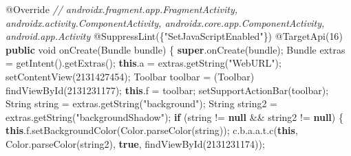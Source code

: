 \documentclass[
]{article}
\newenvironment{Shaded}{}{}
\newcommand{\AttributeTok}[1]{\textcolor[rgb]{0.49,0.56,0.16}{#1}}
\newcommand{\BuiltInTok}[1]{\textcolor[rgb]{0.00,0.50,0.00}{#1}}
\newcommand{\CommentTok}[1]{\textcolor[rgb]{0.38,0.63,0.69}{\textit{#1}}}
\newcommand{\ControlFlowTok}[1]{\textcolor[rgb]{0.00,0.44,0.13}{\textbf{#1}}}
\newcommand{\DataTypeTok}[1]{\textcolor[rgb]{0.56,0.13,0.00}{#1}}
\newcommand{\DecValTok}[1]{\textcolor[rgb]{0.25,0.63,0.44}{#1}}
\newcommand{\FunctionTok}[1]{\textcolor[rgb]{0.02,0.16,0.49}{#1}}
\newcommand{\KeywordTok}[1]{\textcolor[rgb]{0.00,0.44,0.13}{\textbf{#1}}}
\newcommand{\NormalTok}[1]{#1}
\newcommand{\OperatorTok}[1]{\textcolor[rgb]{0.40,0.40,0.40}{#1}}
\newcommand{\StringTok}[1]{\textcolor[rgb]{0.25,0.44,0.63}{#1}}
\begin{document}
\begin{Shaded}
\begin{Highlighting}[]
    \AttributeTok{@Override} \CommentTok{// androidx.fragment.app.FragmentActivity, androidx.activity.ComponentActivity, androidx.core.app.ComponentActivity, android.app.Activity}
    \AttributeTok{@SuppressLint}\OperatorTok{(\{}\StringTok{"SetJavaScriptEnabled"}\OperatorTok{\})}
    \AttributeTok{@TargetApi}\OperatorTok{(}\DecValTok{16}\OperatorTok{)}
    \KeywordTok{public} \DataTypeTok{void} \FunctionTok{onCreate}\OperatorTok{(}\NormalTok{Bundle bundle}\OperatorTok{)} \OperatorTok{\{}
        \KeywordTok{super}\OperatorTok{.}\FunctionTok{onCreate}\OperatorTok{(}\NormalTok{bundle}\OperatorTok{);}
\NormalTok{        Bundle extras }\OperatorTok{=} \FunctionTok{getIntent}\OperatorTok{().}\FunctionTok{getExtras}\OperatorTok{();}
        \KeywordTok{this}\OperatorTok{.}\FunctionTok{a} \OperatorTok{=}\NormalTok{ extras}\OperatorTok{.}\FunctionTok{getString}\OperatorTok{(}\StringTok{"WebURL"}\OperatorTok{);}
        \FunctionTok{setContentView}\OperatorTok{(}\DecValTok{2131427454}\OperatorTok{);}
\NormalTok{        Toolbar toolbar }\OperatorTok{=} \OperatorTok{(}\NormalTok{Toolbar}\OperatorTok{)} \FunctionTok{findViewById}\OperatorTok{(}\DecValTok{2131231177}\OperatorTok{);}
        \KeywordTok{this}\OperatorTok{.}\FunctionTok{f} \OperatorTok{=}\NormalTok{ toolbar}\OperatorTok{;}
        \FunctionTok{setSupportActionBar}\OperatorTok{(}\NormalTok{toolbar}\OperatorTok{);}
        \BuiltInTok{String}\NormalTok{ string }\OperatorTok{=}\NormalTok{ extras}\OperatorTok{.}\FunctionTok{getString}\OperatorTok{(}\StringTok{"background"}\OperatorTok{);}
        \BuiltInTok{String}\NormalTok{ string2 }\OperatorTok{=}\NormalTok{ extras}\OperatorTok{.}\FunctionTok{getString}\OperatorTok{(}\StringTok{"backgroundShadow"}\OperatorTok{);}
        \ControlFlowTok{if} \OperatorTok{(}\NormalTok{string }\OperatorTok{!=} \KeywordTok{null} \OperatorTok{\&\&}\NormalTok{ string2 }\OperatorTok{!=} \KeywordTok{null}\OperatorTok{)} \OperatorTok{\{}
            \KeywordTok{this}\OperatorTok{.}\FunctionTok{f}\OperatorTok{.}\FunctionTok{setBackgroundColor}\OperatorTok{(}\BuiltInTok{Color}\OperatorTok{.}\FunctionTok{parseColor}\OperatorTok{(}\NormalTok{string}\OperatorTok{));}
\NormalTok{            c}\OperatorTok{.}\FunctionTok{b}\OperatorTok{.}\FunctionTok{a}\OperatorTok{.}\FunctionTok{a}\OperatorTok{.}\FunctionTok{t}\OperatorTok{.}\FunctionTok{c}\OperatorTok{(}\KeywordTok{this}\OperatorTok{,} \BuiltInTok{Color}\OperatorTok{.}\FunctionTok{parseColor}\OperatorTok{(}\NormalTok{string2}\OperatorTok{),} \KeywordTok{true}\OperatorTok{,} \FunctionTok{findViewById}\OperatorTok{(}\DecValTok{2131231174}\OperatorTok{));}

\end{Highlighting}
\end{Shaded}
\end{document}
